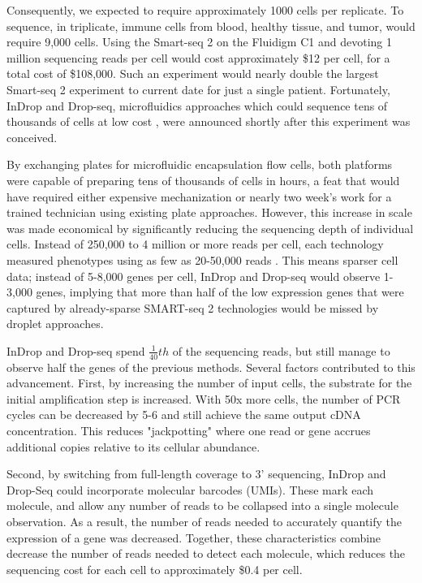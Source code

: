 Consequently, we expected to require approximately 1000 cells per replicate. 
To sequence, in triplicate, immune cells from blood, healthy tissue, and tumor, would require 9,000 cells. 
Using the Smart-seq 2 on the Fluidigm C1 and devoting 1 million sequencing reads per cell would cost approximately \$12 per cell, for a total cost of \$108,000.
Such an experiment would nearly double the largest Smart-seq 2 experiment to current date for just a single patient\citep{Zheng2017}. 
Fortunately, InDrop and Drop-seq, microfluidics approaches which could sequence tens of thousands of cells at low cost \citep{Klein2015,Macosko2015}, were announced shortly after this experiment was conceived. 

By exchanging plates for microfluidic encapsulation flow cells, both platforms were capable of preparing tens of thousands of cells in hours, a feat that would have required either expensive mechanization or nearly two week’s work for a trained technician using existing plate approaches. 
However, this increase in scale was made economical by significantly reducing the sequencing depth of individual cells.
Instead of 250,000 to 4 million or more reads per cell, each technology measured phenotypes using as few as 20-50,000 reads \citep{Klein2015,Macosko2015}.
This means sparser cell data; instead of 5-8,000 genes per cell, InDrop and Drop-seq would observe 1-3,000 genes, implying that more than half of the low expression genes that were captured by already-sparse SMART-seq 2 technologies would be missed by droplet approaches.  

InDrop and Drop-seq spend $\frac{1}{40}th$ of the sequencing reads, but still manage to observe half the genes of the previous methods. 
Several factors contributed to this advancement. 
First, by increasing the number of input cells, the substrate for the initial amplification step is increased. With 50x more cells, the number of PCR cycles can be decreased by 5-6 and still achieve the same output cDNA concentration.
This reduces "jackpotting" where one read or gene accrues additional copies relative to its cellular abundance. 

Second, by switching from full-length coverage to 3' sequencing, InDrop and Drop-Seq could incorporate molecular barcodes (UMIs). These mark each molecule, and allow any number of reads to be collapsed into a single molecule observation. 
As a result, the number of reads needed to accurately quantify the expression of a gene was decreased. 
Together, these characteristics combine decrease the number of reads needed to detect each molecule, which reduces the sequencing cost for each cell to approximately \$0.4 per cell.

